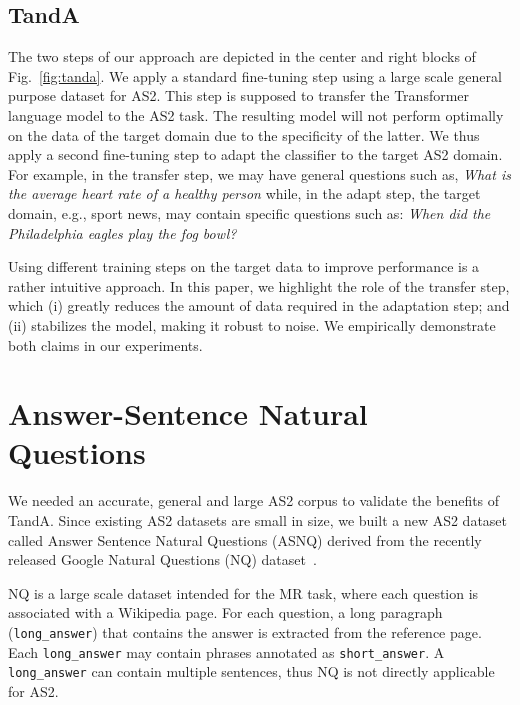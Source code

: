 \documentclass[letterpaper]{article} \usepackage{aaai20}  \usepackage{times}  \usepackage{helvet} \usepackage{courier}  \usepackage[hyphens]{url}  \usepackage{graphicx} \urlstyle{rm} \def\UrlFont{\rm}  \usepackage{graphicx}  \usepackage{todonotes}
\newcommand{\TANDA}{T{\sc and}A}
\begin{document}
\subsection{{\TANDA}}

The two steps of our approach are depicted in the center and right blocks of Fig.~\ref{fig:tanda}. We apply a standard fine-tuning step using a large scale general purpose dataset for AS2. This step is supposed to transfer the Transformer language model to the AS2 task. The resulting model will not perform optimally on the data of the target domain due to the specificity of the latter. We thus apply a second fine-tuning step to adapt the classifier to the target AS2 domain.
For example, in the transfer step, we may have general questions such as, \emph{What is the average heart rate of a healthy person} while, in the adapt step, the target domain, e.g., sport news, may contain specific questions such as: \emph{When did the Philadelphia eagles play the fog bowl?}

Using different training steps on the target data to improve performance is a rather intuitive approach.
In this paper, we highlight the role of the transfer step, which (i) greatly reduces the amount of data required in the adaptation step; and (ii) stabilizes the model, making it robust to noise.
We empirically demonstrate both claims in our experiments.














\section{Answer-Sentence Natural Questions}
\label{ASNQ}

We needed an accurate, general and large AS2 corpus to validate the benefits of {\TANDA}. Since existing AS2 datasets are small in size, we built a new AS2 dataset called Answer Sentence Natural Questions (ASNQ) derived from the recently released Google Natural Questions (NQ) dataset~\cite{47761}.

NQ is a large scale dataset intended for the MR task, where each question is associated with a Wikipedia page. For each question, a long paragraph (\texttt{long\_answer}) that contains the answer is extracted from the reference page. Each \texttt{long\_answer} may contain phrases annotated as \texttt{short\_answer}. A \texttt{long\_answer} can contain multiple sentences, thus NQ is not directly applicable for AS2.
\end{document}

